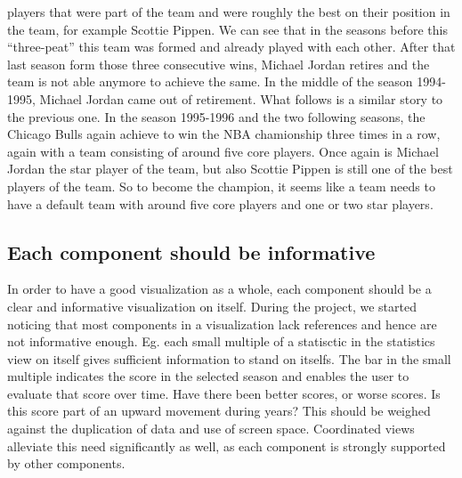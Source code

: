 \documentclass[]{sigchi}
\begin{document}
players that were part of the team and were roughly the best on their position in 
the team, for example Scottie Pippen. We can see that in the seasons before this 
``three-peat'' this team was formed and already played with each other. After that 
last season form those three consecutive wins, Michael Jordan retires and the team 
is not able anymore to achieve the same. In the middle of the season 1994-1995, Michael Jordan came out of retirement. What follows is a similar story to the previous one. In the season 1995-1996 and the two following seasons, the Chicago 
Bulls again achieve to win the NBA chamionship three times in a row, again with a  team consisting of around five core players. Once again is Michael Jordan the star 
player of the team, but also Scottie Pippen is still one of the best players of the team. So to become the champion, it seems like a team needs to have a default team 
with around five core players and one or two star players.


\subsection{Each component should be informative}
In order to have a good visualization as a whole, each component should be a
clear and informative visualization on itself. During the project, we started noticing that most components in a visualization lack references and hence are not informative enough. Eg. each small multiple of a statisctic in the statistics view on itself gives sufficient information to stand on itselfs. The bar in the small multiple indicates the score in the selected season and enables the user to evaluate that score over time. Have there been better scores, or worse scores. Is this score
part of an upward movement during years? This should be weighed against the
duplication of data and use of screen space. Coordinated views alleviate this
need significantly as well, as each component is strongly supported by other
components.
\end{document}
